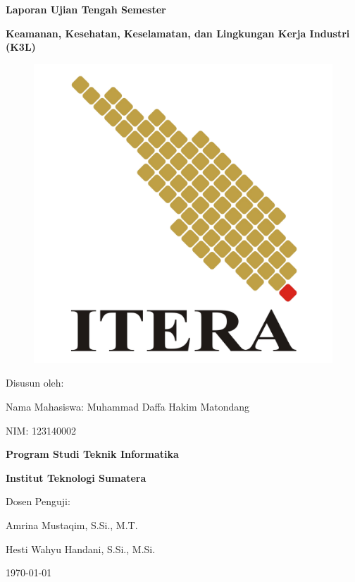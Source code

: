\documentclass[a4paper, 12pt]{article}
\begin{document}
\begin{titlepage}
    \centering
    
    {\Huge\bfseries Laporan Ujian Tengah Semester\par}
    \vspace{0.5cm}
    {\LARGE\bfseries Keamanan, Kesehatan, Keselamatan, dan Lingkungan Kerja Industri (K3L)\par}
    
    \vspace{2.5cm}
    \begin{figure}[htbp] 
        \centering
        \includegraphics[width=0.4\linewidth]{Logo_ITERA.png}
        \label{fig:logo}
    \end{figure}
    {\large Disusun oleh:\par}
    \vspace{0.5cm}
    {\Large Nama Mahasiswa: Muhammad Daffa Hakim Matondang\par}
    {\Large NIM: 123140002\par}
    
    {\large\bfseries Program Studi Teknik Informatika\par}
    {\large\bfseries Institut Teknologi Sumatera\par}
    \vspace{0.5cm}
    {\large Dosen Penguji:\par}
    {\large Amrina Mustaqim, S.Si., M.T.\par}
    {\large Hesti Wahyu Handani, S.Si., M.Si.\par}
    \vspace{0.5cm}
    {\large \today\par} 
\end{titlepage}
\end{document}
